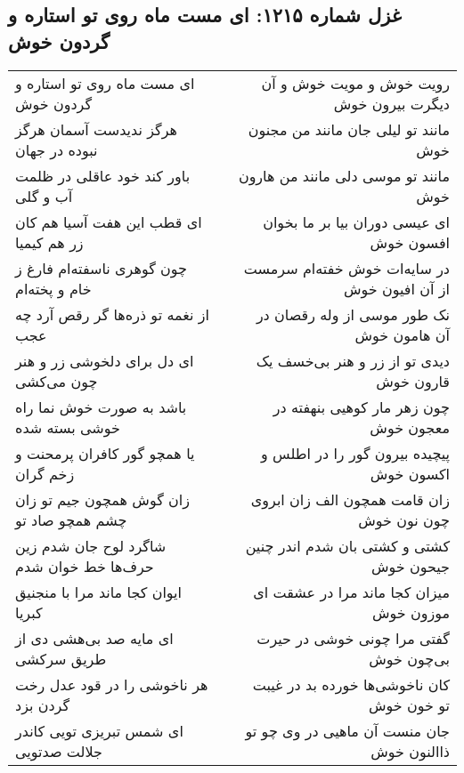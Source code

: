 \begin{center}
\section*{غزل شماره ۱۲۱۵: ای مست ماه روی تو استاره و گردون خوش}
\label{sec:1215}
\begin{longtable}{l p{0.5cm} r}
ای مست ماه روی تو استاره و گردون خوش
&&
رویت خوش و مویت خوش و آن دیگرت بیرون خوش
\\
هرگز ندیدست آسمان هرگز نبوده در جهان
&&
مانند تو لیلی جان مانند من مجنون خوش
\\
باور کند خود عاقلی در ظلمت آب و گلی
&&
مانند تو موسی دلی مانند من هارون خوش
\\
ای قطب این هفت آسیا هم کان زر هم کیمیا
&&
ای عیسی دوران بیا بر ما بخوان افسون خوش
\\
چون گوهری ناسفته‌ام فارغ ز خام و پخته‌ام
&&
در سایه‌ات خوش خفته‌ام سرمست از آن افیون خوش
\\
از نغمه تو ذره‌ها گر رقص آرد چه عجب
&&
نک طور موسی از وله رقصان در آن هامون خوش
\\
ای دل برای دلخوشی زر و هنر چون می‌کشی
&&
دیدی تو از زر و هنر بی‌خسف یک قارون خوش
\\
باشد به صورت خوش نما راه خوشی بسته شده
&&
چون زهر مار کوهیی بنهفته در معجون خوش
\\
یا همچو گور کافران پرمحنت و زخم گران
&&
پیچیده بیرون گور را در اطلس و اکسون خوش
\\
زان گوش همچون جیم تو زان چشم همچو صاد تو
&&
زان قامت همچون الف زان ابروی چون نون خوش
\\
شاگرد لوح جان شدم زین حرف‌ها خط خوان شدم
&&
کشتی و کشتی بان شدم اندر چنین جیحون خوش
\\
ایوان کجا ماند مرا با منجنیق کبریا
&&
میزان کجا ماند مرا در عشقت ای موزون خوش
\\
ای مایه صد بی‌هشی دی از طریق سرکشی
&&
گفتی مرا چونی خوشی در حیرت بی‌چون خوش
\\
هر ناخوشی را در قود عدل رخت گردن بزد
&&
کان ناخوشی‌ها خورده بد در غیبت تو خون خوش
\\
ای شمس تبریزی تویی کاندر جلالت صدتویی
&&
جان منست آن ماهیی در وی چو تو ذاالنون خوش
\\
\end{longtable}
\end{center}

